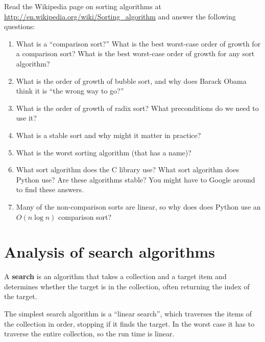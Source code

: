 \documentclass[10pt]{book}
\begin{document}
\begin{exercise}

Read the Wikipedia page on sorting algorithms at
\url{http://en.wikipedia.org/wiki/Sorting_algorithm} and answer
the following questions:

\begin{enumerate}

\item What is a ``comparison sort?'' What is the best worst-case order
  of growth for a comparison sort?  What is the best worst-case order
  of growth for any sort algorithm?

\item What is the order of growth of bubble sort, and why does Barack
  Obama think it is ``the wrong way to go?''

\item What is the order of growth of radix sort?  What preconditions
  do we need to use it?

\item What is a stable sort and why might it matter in practice?

\item What is the worst sorting algorithm (that has a name)?

\item What sort algorithm does the C library use?  What sort algorithm
  does Python use?  Are these algorithms stable?  You might have to
  Google around to find these answers.

\item Many of the non-comparison sorts are linear, so why does does
  Python use an $O(n \log n)$ comparison sort?

\end{enumerate}

\end{exercise}


\section{Analysis of search algorithms}

A {\bf search} is an algorithm that takes a collection and a target
item and determines whether the target is in the collection, often
returning the index of the target.

The simplest search algorithm is a ``linear search'', which traverses
the items of the collection in order, stopping if it finds the target.
In the worst case it has to traverse the entire collection, so the run
time is linear.
\end{document}
